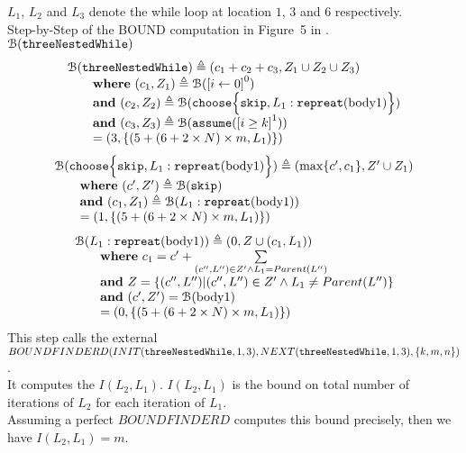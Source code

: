 \begin{enumerate}
    $L_1$, $L_2$ and $L_3$ denote the while loop at location $1$, $3$ and $6$ respectively.
    \\
    Step-by-Step of the BOUND computation in Figure~5 in \cite{GulwaniJK09}.
    \\
    \newcommand{\BD}{\mathcal{B}}
$\BD(\kw{threeNestedWhile})$
    \[
      \begin{array}{l}
        \BD(\kw{threeNestedWhile})  \triangleq  (c_1 + c_2 + c_3, Z_1 \cup Z_2 \cup Z_3) 
        \\ \qquad
    \textbf{where} ~(c_1, Z_1) \triangleq  \BD(\clabel{ \assign{i}{0} }^{0})
        \\ \qquad
    \textbf{and} ~(c_2, Z_2) \triangleq  \BD( \rpchoose\Big\{\eskip, L_1: \rprepeat(\text{body1})\Big\})
        \\ \qquad
    \textbf{and} ~(c_3, Z_3) \triangleq  \BD(\rpasum(\clabel{i \geq k}^{1})) 
        \\ \qquad = (3, \{(5 + (6 + 2 \times N) \times m, L_1)\})
      \end{array}
  \]
  \[
    \begin{array}{l}
      \BD( \rpchoose\Big\{\eskip, L_1: \rprepeat(\text{body1}) \Big\})  \triangleq 
      (\max\{c', c_1\}, Z' \cup Z_1) \\ \qquad
      \textbf{where} ~ (c', Z')  \triangleq  \BD(\eskip)
      \\ \qquad
    \textbf{and} ~ (c_1, Z_1) \triangleq  \BD(L_1: \rprepeat(\text{body1}))
      \\ \qquad = (1, \{(5 + (6 + 2 \times N) \times m, L_1)\})
    \end{array}
\]
\[
  \begin{array}{l}
    \BD(L_1: \rprepeat(\text{body1}))  \triangleq (0, Z \cup (c_1, L_1)) \\ \qquad
    \textbf{where} ~ c_1 = c' + \sum\limits_{(c'', L'') \in Z' \land L_1 = Parent(L'')}
    \\ \qquad
    \textbf{and} ~
    Z = \{(c'', L'') | (c'', L'') \in Z' \land L_1 \neq Parent(L'')\}
    \\
    \qquad
    \textbf{and} ~ (c', Z') = \BD(\text{body1})
    \\ \qquad = (0, \{(5 + (6 + 2 \times N) \times m, L_1)\})
\end{array}
\]
This step calls the external 
\\
$BOUNDFINDERD(INIT(\mathtt{threeNestedWhile}, 1, 3), NEXT(\mathtt{threeNestedWhile}, 1, 3), \{k, m, n\})$.
\\
It computes the $I(L_2, L_1)$.
$I(L_2, L_1)$ is the bound on total number of iterations of $L_2$ for each iteration of $L_1$.
\\
Assuming a perfect $BOUNDFINDERD$ computes this bound precisely, then we have $I(L_2, L_1) = m$.


\end{enumerate}
